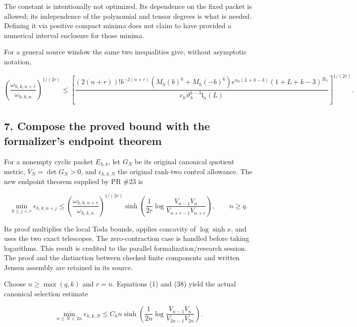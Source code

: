 \documentclass[11pt,a4paper]{article}
\begin{document}
The constant is intentionally not optimized. Its dependence on the fixed packet is allowed; its independence of the polynomial and tensor degrees is what is needed. Defining it via positive compact minima does not claim to have provided a numerical interval enclosure for those minima.

For a general source window the same two inequalities give, without asymptotic notation,

\[
 \left(\frac{\omega_{h,k,n+r}}{\omega_{h,k,n}}\right)^{1/(2r)}
 \le\left[
 \frac{(2(n+r))!b^{-2(n+r)}(M_h(b)^k+M_h(-b)^k)
       e^{\alpha_0(L+k-3)}(1+L+k-3)^{B_h}}
      {c_h\vartheta_h^{k-3}\mathfrak l_n(L)}
       \right]^{1/(2r)}.                                               \tag{37}
\]

\subsection{7. Compose the proved bound with the formalizer's endpoint theorem}\label{zlm:endpoint-arithmetic_original--compose-the-proved-bound-with-the-formalizers-endpoint-theorem}

For a nonempty cyclic packet \(E_{h,k}\), let \(G_N\) be its original canonical quotient metric, \(V_N=\det G_N>0\), and \(\epsilon_{h,k,N}\) the original rank-two control allowance. The new endpoint theorem supplied by PR \#23 is

\[
 \min_{0\le j<r}\epsilon_{h,k,n+j}
 \le
 \left(\frac{\omega_{h,k,n+r}}{\omega_{h,k,n}}\right)^{1/(2r)}
 \sinh\!\left(\frac1{2r}
       \log\frac{V_{n-1}V_n}{V_{n+r-1}V_{n+r}}\right),\qquad n\ge q.
                                                                         \tag{38}
\]

Its proof multiplies the local Toda bounds, applies concavity of \(\log\sinh x\), and uses the two exact telescopes. The zero-contraction case is handled before taking logarithms. This result is credited to the parallel formalization/research session. The proof and the distinction between checked finite components and written Jensen assembly are retained in its source.

Choose \(n\ge\max(q,k)\) and \(r=n\). Equations (1) and (38) yield the actual canonical selection estimate

\[
 \boxed{
 \min_{n\le N<2n}\epsilon_{h,k,N}
 \le C_hn\sinh\!\left(\frac1{2n}
                 \log\frac{V_{n-1}V_n}{V_{2n-1}V_{2n}}\right).
 }                                                                     \tag{39}
\]
\end{document}
